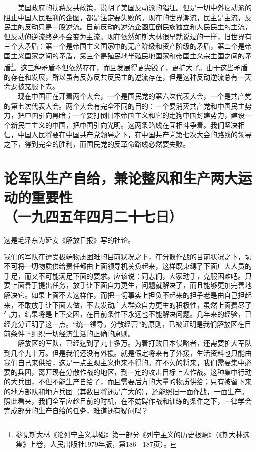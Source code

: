 \documentclass[cn,11pt,chinese]{elegantbook}
\def\myformat#1{\hfil\hfil #1}
\begin{document}
　　美国政府的扶蒋反共政策，说明了美国反动派的猖狂。但是一切中外反动派的阻止中国人民胜利的企图，都是注定要失败的。现在的世界潮流，民主是主流，反民主的反动只是一股逆流。目前反动的逆流企图压倒民族独立和人民民主的主流，但反动的逆流终究不会变为主流。现在依然如斯大林很早就说过的一样，旧世界有三个大矛盾：第一个是帝国主义国家中的无产阶级和资产阶级的矛盾，第二个是帝国主义国家之间的矛盾，第三个是殖民地半殖民地国家和帝国主义宗主国之间的矛盾\footnote[4]{ 参见斯大林《论列宁主义基础》第一部分《列宁主义的历史根源》（《斯大林选集》上卷，人民出版社1979年版，第186—187页）。}。这三种矛盾不但依然存在，而且发展得更尖锐了，更扩大了。由于这些矛盾的存在和发展，所以虽有反苏反共反民主的逆流存在，但是这种反动逆流总有一天会要被克服下去。\\
　　现在中国正在开着两个大会，一个是国民党的第六次代表大会，一个是共产党的第七次代表大会。两个大会有完全不同的目的：一个要消灭共产党和中国民主势力，把中国引向黑暗；一个要打倒日本帝国主义和它的走狗中国封建势力，建设一个新民主主义的中国，把中国引向光明。这两条路线在互相斗争着。我们坚决相信，中国人民将要在中国共产党领导之下，在中国共产党第七次大会的路线的领导之下，得到完全的胜利，而国民党的反革命路线必然要失败。\\
\newpage\section*{\myformat{论军队生产自给，兼论整风和生产两大运动的重要性}\\\myformat{（一九四五年四月二十七日）}}
\begin{introduction}\item  这是毛泽东为延安《解放日报》写的社论。\end{introduction}
我们的军队在遭受极端物质困难的目前状况之下，在分散作战的目前状况之下，切不可将一切物质供给责任都由上面领导机关负起来，这样既束缚了下面广大人员的手足，而又不可能满足下面的要求。应该说：同志们，大家动手，克服困难吧。只要上面善于提出任务，放手让下面自力更生，问题就解决了，而且能够更加完善地解决它。如果上面不去这样作，而把一切事实上担负不起来的担子老是由自己担起来，不敢放手让下面去做，不去发动广大群众自力更生的积极性，虽然上面费尽了气力，结果将是上下交困，在目前条件下永远也不能解决问题。几年来的经验，已经充分证明了这一点。“统一领导，分散经营”的原则，已被证明是我们解放区在目前条件下组织一切经济生活的正确的原则。\\
　　解放区的军队，已经达到了九十多万。为着打败日本侵略者，还需要扩大军队到几个九十万。但是我们还没有外援。就是假定将来有了外援，生活资料也只能由我们自己来供给，这是一点主观主义也来不得的。在不久的将来，我们需要集中必要的兵团，离开现在分散作战的地区，到一定的攻击目标上去作战。这种集中行动的大兵团，不但不能生产自给了，而且需要后方的大量的物质供给；只有被留下来的地方部队和地方兵团（其数目将还是广大的），还能照旧一面作战，一面生产。照此看来，我们全军应趁目前的时机，在不妨碍作战和训练的条件之下，一律学会完成部分的生产自给的任务，难道还有疑问吗？\\
\end{document}
